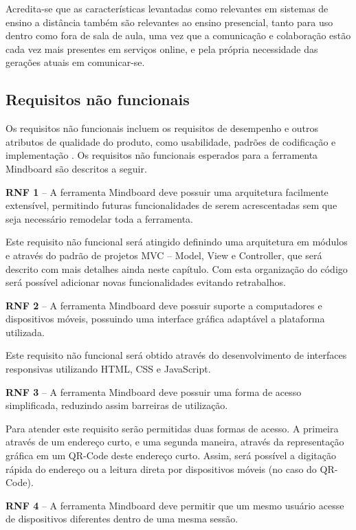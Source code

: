 Acredita-se que as características levantadas como relevantes em sistemas de ensino a distância também são relevantes ao ensino presencial, tanto para uso dentro como fora de sala de aula, uma vez que a comunicação e colaboração estão cada vez mais presentes em serviços online, e pela própria necessidade das gerações atuais em comunicar-se.


\subsection{Requisitos não funcionais}

Os requisitos não funcionais incluem os requisitos de desempenho e outros atributos de qualidade do produto, como usabilidade, padrões de codificação e implementação \cite{padua}. Os requisitos não funcionais esperados para a ferramenta Mindboard são descritos a seguir.

\textbf{RNF 1} – A ferramenta Mindboard deve possuir uma arquitetura facilmente extensível, permitindo futuras funcionalidades de serem acrescentadas sem que seja necessário remodelar toda a ferramenta.

Este requisito não funcional será atingido definindo uma arquitetura em módulos e através do padrão de projetos MVC – Model, View e Controller, que será descrito com mais detalhes ainda neste capítulo. Com esta organização do código será possível adicionar novas funcionalidades evitando retrabalhos.


\textbf{RNF 2} – A ferramenta Mindboard deve possuir suporte a computadores e dispositivos móveis, possuindo uma interface gráfica adaptável a plataforma utilizada.

Este requisito não funcional será obtido através do desenvolvimento de interfaces responsivas utilizando HTML, CSS e JavaScript.

\textbf{RNF 3} – A ferramenta Mindboard deve possuir uma forma de acesso simplificada, reduzindo assim barreiras de utilização. 

Para atender este requisito serão permitidas duas formas de acesso. A primeira através de um endereço curto, e uma segunda maneira, através da representação gráfica em um QR-Code deste endereço curto. Assim, será possível a digitação rápida do endereço ou a leitura direta por dispositivos móveis (no caso do QR-Code).

\textbf{RNF 4} – A ferramenta Mindboard deve permitir que um mesmo usuário acesse de dispositivos diferentes dentro de uma mesma sessão. 

